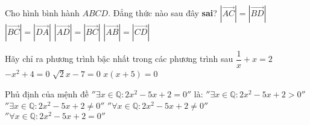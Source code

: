 \begin{ex}%
	Cho hình bình hành $ABCD$. Đẳng thức nào sau đây \textbf{sai}?
	\choice
	{ \True $ |\overrightarrow{AC}|=\left| \overrightarrow{BD}\right|$}
	{$\left| \overrightarrow{BC}\right|=\left| \overrightarrow{DA}\right|$}
	{$\left| \overrightarrow{AD}\right|=\left| \overrightarrow{BC}\right|$}
	{$\left| \overrightarrow{AB}\right|=\left| \overrightarrow{CD}\right|$}
\end{ex}
\begin{ex}%
	Hãy chỉ ra phương trình bậc  nhất trong các phương trình sau
	\choice
	{$\dfrac{1}{x}+x=2$}
	{$-x^2+4=0$}
	{\True$\sqrt{2}x-7=0$}
	{$x(x+5)=0$}
\end{ex}
\begin{ex}%
	Phủ định của mệnh đề $''\exists x\in \mathbb{Q}:2x^2-5x+2=0''$ là:
	\choice
	{$''\exists x\in \mathbb{Q}:2x^2-5x+2>0''$}
	{$''\exists x\in \mathbb{Q}:2x^2-5x+2\ne 0''$}
	{\True $''\forall x\in \mathbb{Q}:2x^2-5x+2\ne 0''$}
	{$''\forall x\in \mathbb{Q}:2x^2-5x+2=0''$}
	\loigiai{}
\end{ex}

